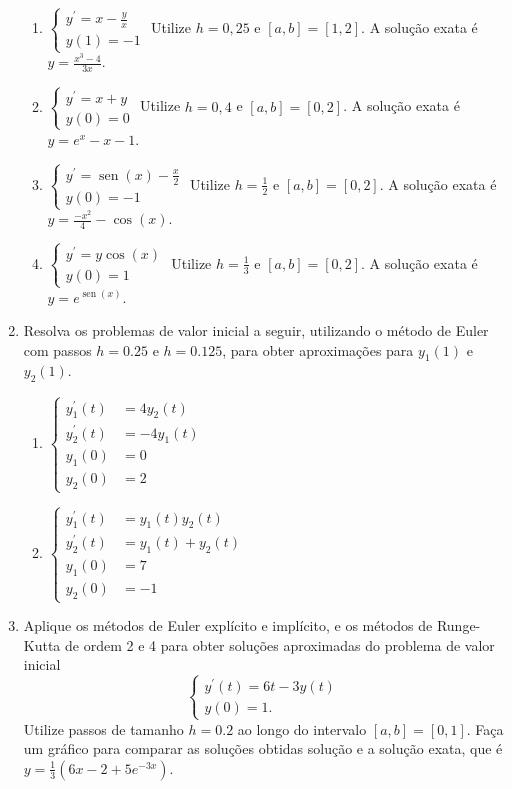 \documentclass[12pt,a4paper]{article}
\newcommand*\sen{\operatorname{sen}}
\begin{document}
\begin{enumerate}
\begin{enumerate}
\item $\begin{cases}
y^\prime = x-\frac{y}{x} \\
y(1) = -1
\end{cases}$
Utilize $h = 0,25$ e $[a,b] = [1, 2]$. A solução exata é $y = \frac{x^3 - 4}{3x}$.
\item $\begin{cases}
y^\prime = x+y \\
y(0) = 0
\end{cases}$
Utilize $h = 0,4$ e $[a,b] = [0, 2]$. A solução exata é $y = e^x - x - 1$.
\item $\begin{cases}
y^\prime = \sen(x) - \frac{x}{2} \\
y(0) = -1
\end{cases}$
Utilize $h = \frac{1}{2}$ e $[a,b] = [0,2]$. A solução exata é $y = \frac{-x^2}{4} - \cos(x)$.
\item $\begin{cases}
y^\prime = y \cos(x) \\
y(0) = 1
\end{cases}$
Utilize $h = \frac{1}{3}$ e $[a,b] = [0,2]$. A solução exata é $y = e^{\sen(x)}$.
\end{enumerate}

\item Resolva os problemas de valor inicial a seguir, utilizando o método de Euler com passos $h = 0.25$ e $h=0.125$, para obter aproximações para $y_1(1)$ e $y_2(1)$.
\begin{multicols}{2}
\begin{enumerate}
\item $\begin{cases}
y_1^\prime(t) &= 4y_2(t)\\
y_2^\prime(t) &= -4y_1(t)\\
y_1(0) &= 0\\
y_2(0) &= 2
\end{cases}$

\item $\begin{cases}
y_1^\prime(t) &= y_1(t) y_2(t)\\
y_2^\prime(t) &= y_1(t)+y_2(t)\\
y_1(0) &= 7\\
y_2(0) &= -1
\end{cases}$
\end{enumerate}
\end{multicols}

\item Aplique os métodos de Euler explícito e implícito, e os métodos de Runge-Kutta de ordem 2 e 4 para obter soluções aproximadas do problema de valor inicial
\[
\begin{cases}
y^\prime(t) = 6t - 3y(t) \\
y(0) = 1.
\end{cases}\]
Utilize passos de tamanho $h = 0.2$ ao longo do intervalo $[a,b] = [0, 1]$. Faça um gráfico para comparar as soluções obtidas solução e a solução exata, que é $y = \frac{1}{3} (6 x - 2 + 5 e^{-3 x})$.
\end{enumerate}
\end{document}
